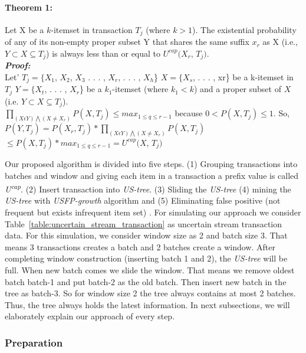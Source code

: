 \documentclass[conference]{IEEEtran}
\begin{document}
  \paragraph{Theorem 1: } Let X be a $k$-itemset in transaction $T_j$ (where $k > 1$). The existential probability of any of its non-empty proper subset Y that shares the same suffix $x_r$ as X (i.e., $Y \subset X \subseteq T_j$) is always less than or equal to $U^{cap}(X_r$, $T_j)$.\\
    \emph{\textbf{Proof:}}\\
    Let'
    $T_j = \{X_1$, $X_2$, $X_3$ . . . , $X_r$, . . . , $X_h$\}
    $X = \{X_s$, . . . , xr\} be a k-itemset in $T_j$
    $Y = \{X_t$, . . . , $X_r$\} be a $k_1$-itemset (where $k_1 < k$) and a proper subset of $X$ (i.e. $Y \subset X \subseteq T_j$).\\
    $\prod_{(X \epsilon Y)\bigwedge (X\neq X_r)}P(X,T_j) \leq max_{1 \leq q \leq r-1}$ because $0< P(X, T_j)\leq 1$. So,\\
     $P(Y,T_j)=P(X_r,T_j)*\prod_{(X \epsilon Y)\bigwedge (X\neq X_r)}P(X,T_j)$\\
     $\leq P(X,T_j)*max_{1 \leq q \leq r-1}=U^{cap}(X$, $T_j)$

Our proposed algorithm is divided into five steps. (1) Grouping transactions into batches and window and giving each item in a transaction a prefix value is called \emph{U\textsuperscript{cap}}. (2) Insert transaction into \emph {US-tree}. (3) Sliding the \emph {US-tree} (4) mining the \emph {US-tree} with \emph{USFP-growth} algorithm and (5) Eliminating false positive (not frequent but exists infrequent item set) . For simulating our approach we consider Table~\ref{table:uncertain_stream_transaction} as uncertain stream transaction data. For this simulation, we consider window size as 2 and batch size 3. That means 3 transactions creates a batch and 2 batches create a window. After completing window construction (inserting batch 1 and 2), the \emph {US-tree} will be full. When new batch comes we slide the window. That means we remove oldest batch batch-1 and put batch-2 as the old batch. Then insert new batch in the tree as batch-3. So for window size 2 the tree always contains at most 2 batches. Thus, the tree always holds the latest information. In next subsections, we will elaborately explain our approach of every step.








\subsubsection{Preparation}
\end{document}
